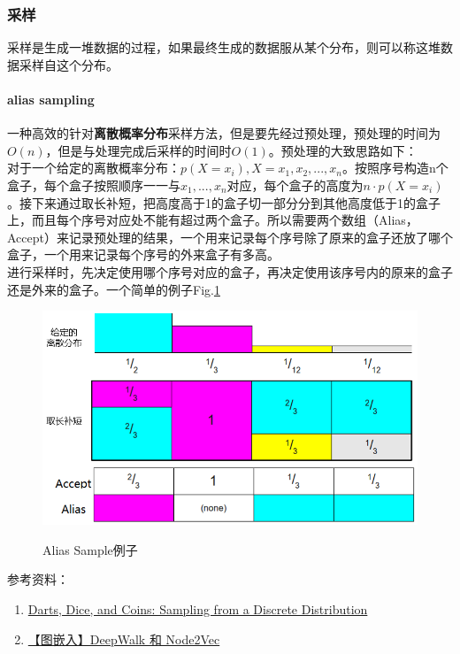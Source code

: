 \subsubsection{采样}
采样是生成一堆数据的过程，如果最终生成的数据服从某个分布，则可以称这堆数据采样自这个分布。
\paragraph{alias sampling }
一种高效的针对\textbf{离散概率分布}采样方法，但是要先经过预处理，预处理的时间为$O(n)$，但是与处理完成后采样的时间时$O(1)$。预处理的大致思路如下：\\
对于一个给定的离散概率分布：$p(X = x_i) , X = x_1, x_2, ..., x_n$。按照序号构造n个盒子，每个盒子按照顺序一一与$x_1, ..., x_n$对应，每个盒子的高度为$n \cdot p(X = x_i)$。接下来通过取长补短，把高度高于1的盒子切一部分分到其他高度低于1的盒子上，而且每个序号对应处不能有超过两个盒子。所以需要两个数组（Alias，Accept）来记录预处理的结果，一个用来记录每个序号除了原来的盒子还放了哪个盒子，一个用来记录每个序号的外来盒子有多高。\\
进行采样时，先决定使用哪个序号对应的盒子，再决定使用该序号内的原来的盒子还是外来的盒子。一个简单的例子Fig.\ref{fig:alias-sample}
\begin{figure}[h]
	\centering
	\includegraphics[width=.8\textwidth]{pics/alias-sample.png}
	\label{fig:alias-sample}
	\caption{Alias Sample例子}
\end{figure}


参考资料：
\begin{enumerate}
    \item \href{https://www.keithschwarz.com/darts-dice-coins/}{Darts, Dice, and Coins: Sampling from a Discrete Distribution}
    \item \href{https://www.cnblogs.com/dogecheng/p/13198198.html}{【图嵌入】DeepWalk 和 Node2Vec}
\end{enumerate}


